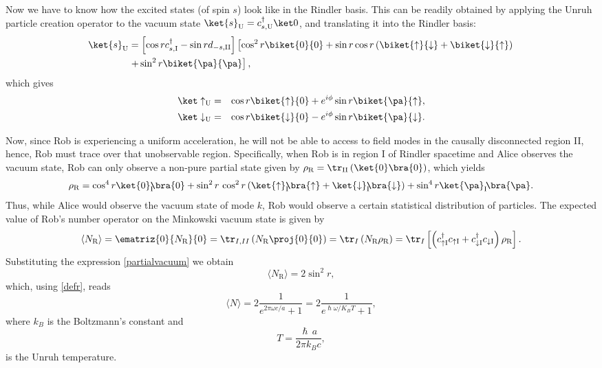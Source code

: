 Now we have to know how the excited states (of spin $s$) look like in the Rindler basis. This can be readily obtained by applying the Unruh particle creation operator to the vacuum state $\ket{s}_\text{U}=c^\dagger_{s,\text{U}}\ket0$, and translating it into the Rindler basis:
\begin{align}\label{onepart1}
 \nonumber\ket{s}_\text{U}&=\left[\cos r c^\dagger_{s,\text{I}}-\sin r d_{-s,\text{II}}\right]\left[\cos^2 r\biket{0}{0}+\sin r\cos r\left(\biket{\uparrow}{\downarrow}+\biket{\downarrow}{\uparrow}\right)\right.\\*
 &\left.+\sin^2 r\biket{\pa}{\pa}\right],
\end{align}
which gives
\begin{eqnarray}\label{onepart2a}
\nonumber\ket\uparrow_\text{U}&=&\cos r \biket{\uparrow}{0}+e^{i\phi}\sin r\biket{\pa}{\uparrow},\\*
\ket\downarrow_\text{U}&=&\cos r \biket{\downarrow}{0}-e^{i\phi}\sin r\biket{\pa}{\downarrow}.
\end{eqnarray}

Now, since Rob is experiencing a uniform acceleration, he will not be able to access to field modes in the causally disconnected region II, hence, Rob must trace over that unobservable region. Specifically, when Rob is in region I of Rindler spacetime and Alice observes the vacuum state, Rob can only observe a non-pure partial state given by $\rho_\text{R}=\tr_\text{II}\left(\ket{0}\bra{0}\right)$, which yields
\begin{equation}\label{partialvacuum}
\rho_\text{R}=\cos^4 r\ket{0}_\text{I}\!\!\bra{0}+\sin^2 r\,\cos^2 r\left(\ket{\uparrow}_\text{I}\!\!\bra{\uparrow}+\ket{\downarrow}_\text{I}\!\!\bra{\downarrow}\right)+\sin^4 r \ket{\pa}_\text{I}\!\bra{\pa}.
\end{equation}
Thus, while Alice would observe the vacuum state of mode $k$, Rob would observe a certain statistical distribution of particles. The expected value of Rob's number operator on the Minkowski vacuum state is given by
\begin{equation}
\langle N_\text{R}\rangle=\ematriz{0}{N_\text{R}}{0}=\tr_{I,II}\left(N_\text{R}\proj{0}{0}\right)=\tr_{I}\left(N_\text{R}\rho_\text{R}\right)=\tr_{I}\left[\left(c_{\uparrow\text{I}}^\dagger c_{\uparrow\text{I}}+c_{\downarrow\text{I}}^\dagger c_{\downarrow\text{I}}\right)\rho_\text{R}\right].
\end{equation}
Substituting the expression \eqref{partialvacuum} we obtain
\begin{equation}
\langle N_\text{R}\rangle=2\sin^2 r,
\end{equation}
which, using \eqref{defr}, reads 
\begin{equation}\label{Unruh}
\langle N \rangle=2\frac{1}{e^{2\pi\omega c/a}+1}=2\frac{1}{e^{\hslash\omega/K_BT}+1},
\end{equation}
where $k_B$ is the Boltzmann's constant and
\begin{equation}
T=\frac{\hslash\, a}{2\pi k_B c},
\end{equation}
is the Unruh temperature.

